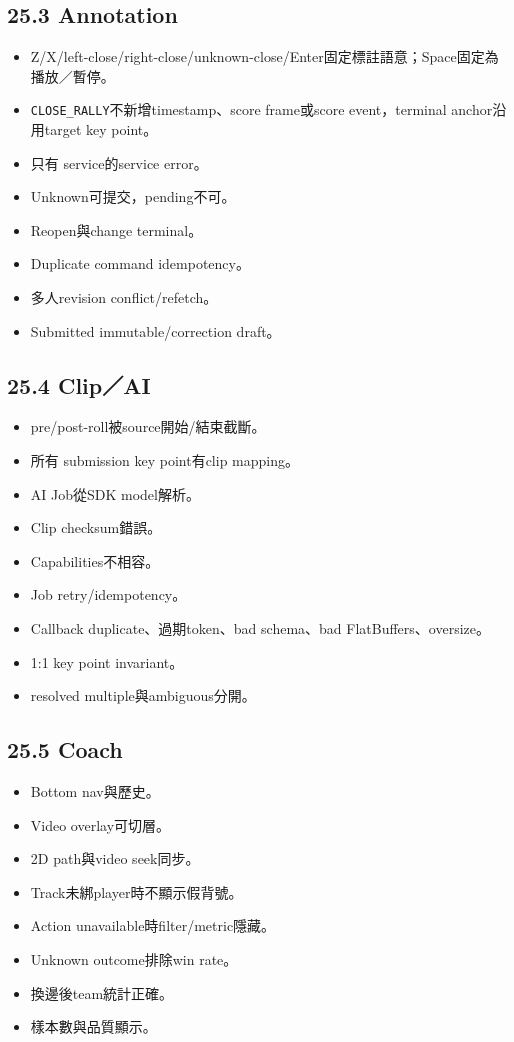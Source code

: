 \documentclass[
  9pt,
  a4paper,
]{article}
\providecommand{\tightlist}{%
  \setlength{\itemsep}{0pt}\setlength{\parskip}{0pt}}
\begin{document}
\subsection{25.3 Annotation}\label{253-annotation}

\begin{itemize}
\tightlist
\item
  Z/X/left-close/right-close/unknown-close/Enter固定標註語意；Space固定為播放／暫停。
\item
  \texttt{CLOSE\_\allowbreak{}RALLY}不新增timestamp、score frame或score event，terminal anchor沿用target key point。
\item
  只有 service的service error。
\item
  Unknown可提交，pending不可。
\item
  Reopen與change terminal。
\item
  Duplicate command idempotency。
\item
  多人revision conflict/refetch。
\item
  Submitted immutable/correction draft。
\end{itemize}

\subsection{25.4 Clip／AI}\label{254-clipai}

\begin{itemize}
\tightlist
\item
  pre/post-roll被source開始/結束截斷。
\item
  所有 submission key point有clip mapping。
\item
  AI Job從SDK model解析。
\item
  Clip checksum錯誤。
\item
  Capabilities不相容。
\item
  Job retry/idempotency。
\item
  Callback duplicate、過期token、bad schema、bad FlatBuffers、oversize。
\item
  1:1 key point invariant。
\item
  resolved multiple與ambiguous分開。
\end{itemize}

\subsection{25.5 Coach}\label{255-coach}

\begin{itemize}
\tightlist
\item
  Bottom nav與歷史。
\item
  Video overlay可切層。
\item
  2D path與video seek同步。
\item
  Track未綁player時不顯示假背號。
\item
  Action unavailable時filter/metric隱藏。
\item
  Unknown outcome排除win rate。
\item
  換邊後team統計正確。
\item
  樣本數與品質顯示。
\end{itemize}
\end{document}
